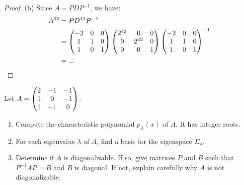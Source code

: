 \documentclass[10pt,twoside,openany]{memoir}
\begin{document}
{\begin{proof}
        (b) Since $A = PDP^{-1}$, we have:
            \begin{equation*}
            \begin{split}
                A^{42}
                & = PD^{42}P^{-1} \\
                & = \left( \begin{matrix} -2 & 0 & 0 \\ 1 & 1 & 0 \\ 1 & 0 & 1 \end{matrix} \right) \left( \begin{matrix} 2^{42} & 0 & 0 \\ 0 & 2^{42} & 0 \\ 0 & 0 & 1 \end{matrix} \right) \left( \begin{matrix} -2 & 0 & 0 \\ 1 & 1 & 0 \\ 1 & 0 & 1 \end{matrix} \right)^{-1} \\
                &= ...
            \end{split}
            \end{equation*}
    \end{proof}}
\begin{problem}[S22, P5]
Let $A= \left( \begin{matrix} 2 & -1 & -1 \\ 1 & 0 & -1 \\ 1 & -1 & 0 \end{matrix} \right)$.
\begin{enumerate}[label = (\alph*),itemsep=1pt,topsep=3pt]
    \item Compute the characteristic polynomial $p_A(x)$ of $A$. It has integer roots.
    \item For each eigenvalue $\lambda$ of $A$, find a basis for the eigenspace $E_\lambda$.
    \item Determine if $A$ is diagonalizable. If so, give matrices $P$ and $B$ such that $P^{-1}A P = B$ and $B$ is diagonal. If not, explain carefully why $A$ is not diagonalizable.
\end{enumerate}
\end{problem}
\end{document}
